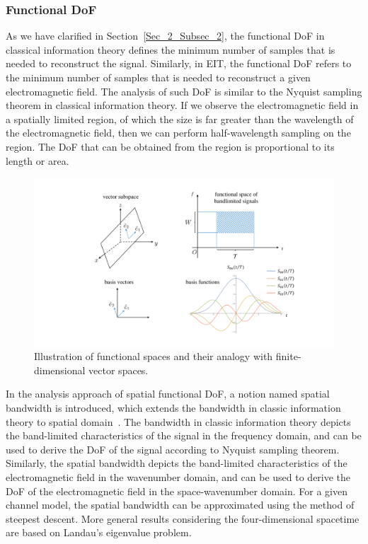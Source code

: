 \documentclass[journal,twocolumn]{IEEEtran}
\begin{document}
\subsubsection{Functional DoF}
As we have clarified in Section~\ref{Sec_2_Subsec_2}, the functional DoF in classical information theory defines the minimum number of samples that is needed to reconstruct the signal. Similarly, in EIT, the functional DoF refers to the minimum number of samples that is needed to reconstruct a given electromagnetic field. The analysis of such DoF is similar to the Nyquist sampling theorem in classical information theory. If we observe the electromagnetic field in a spatially limited region, of which the size is far greater than the wavelength of the electromagnetic field, then we can perform half-wavelength sampling on the region. The DoF that can be obtained from the region is proportional to its length or area. 

\begin{figure}
	\centering 
	\includegraphics[width=\linewidth]{figures/PSWF.pdf} 
	\caption{Illustration of functional spaces and their analogy with finite-dimensional vector spaces. }
	\label{fig:PSWF}
\end{figure}

In the analysis approach of spatial functional DoF, a notion named spatial bandwidth is introduced, which extends the bandwidth in classic information theory to spatial domain~\cite{bucci1987spatial}. The bandwidth in classic information theory depicts the band-limited characteristics of the signal in the frequency domain, and can be used to derive the DoF of the signal according to Nyquist sampling theorem. Similarly, the spatial bandwidth depicts the band-limited characteristics of the electromagnetic field in the wavenumber domain, and can be used to derive the DoF of the electromagnetic field in the space-wavenumber domain. For a given channel model, the spatial bandwidth can be approximated using the method of steepest descent. More general results considering the four-dimensional spacetime are based on Landau's eigenvalue problem.
\end{document}
